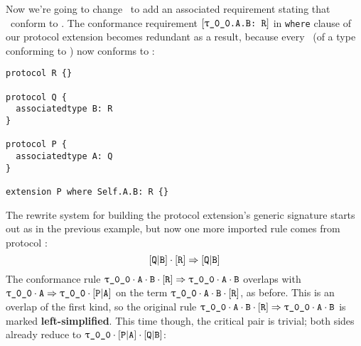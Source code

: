 \documentclass[../generics]{subfiles}
\begin{document}
\begin{example}
Now we're going to change \tQ\ to add an associated requirement stating that \nB\ conform to \tR. The conformance requirement $\ConfReq{\rT.A.B}{R}$ in \texttt{where} clause of our protocol extension becomes redundant as a result, because every \nB\ (of a type conforming to \tQ) now conforms to \tR:
\begin{Verbatim}
protocol R {}

protocol Q {
  associatedtype B: R
}

protocol P {
  associatedtype A: Q
}

extension P where Self.A.B: R {}
\end{Verbatim}
The rewrite system for building the protocol extension's generic signature starts out as in the previous example, but now one more imported rule comes from protocol \tQ:
\[[\texttt{Q}|\texttt{B}]\cdot[\texttt{R}]\Rightarrow [\texttt{Q}|\texttt{B}]\]
The conformance rule $\ProtoConf{\rT\cdot\nA\cdot\nB}{R}$ overlaps with $\rT\cdot\nA\Rightarrow\rT\cdot\aPA$ on the term $\rT\cdot\nA\cdot\nB\cdot\pR$, as before. This is an overlap of the first kind, so the original rule $\ProtoConf{\rT\cdot\nA\cdot\nB}{R}$ is marked \textbf{left-simplified}. This time though, the critical pair is trivial; both sides already reduce to $\rT\cdot\aPA\cdot\assocsym{Q}{B}$:
\begin{center}
\end{center}
\end{example}
\end{document}
